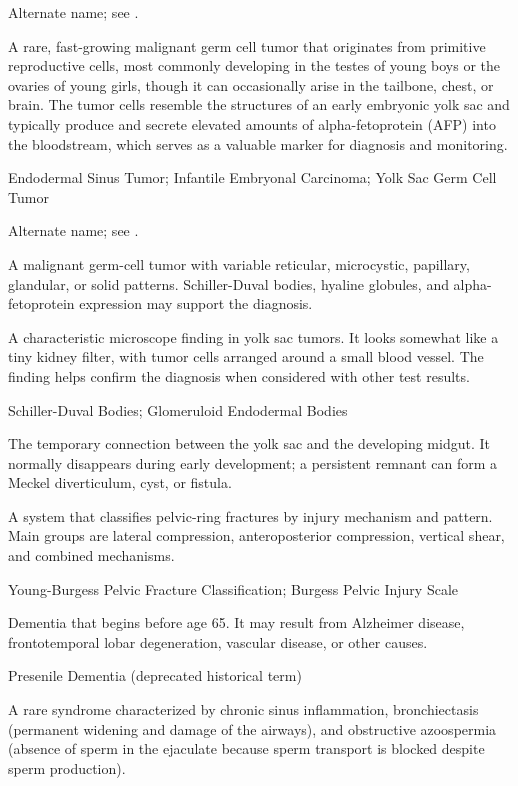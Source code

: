  Alternate name; see .

 A rare, fast-growing malignant germ cell tumor that originates from primitive reproductive cells, most commonly developing in the testes of young boys or the ovaries of young girls, though it can occasionally arise in the tailbone, chest, or brain. The tumor cells resemble the structures of an early embryonic yolk sac and typically produce and secrete elevated amounts of alpha-fetoprotein (AFP) into the bloodstream, which serves as a valuable marker for diagnosis and monitoring.

\synonyms
Endodermal Sinus Tumor; Infantile Embryonal Carcinoma; Yolk Sac Germ Cell Tumor

 Alternate name; see .

 A malignant germ-cell tumor with variable reticular, microcystic, papillary, glandular, or solid patterns. Schiller-Duval bodies, hyaline globules, and alpha-fetoprotein expression may support the diagnosis.

 A characteristic microscope finding in yolk sac tumors. It looks somewhat like a tiny kidney filter, with tumor cells arranged around a small blood vessel. The finding helps confirm the diagnosis when considered with other test results.

\synonyms
Schiller-Duval Bodies; Glomeruloid Endodermal Bodies

 The temporary connection between the yolk sac and the developing midgut. It normally disappears during early development; a persistent remnant can form a Meckel diverticulum, cyst, or fistula.

 A system that classifies pelvic-ring fractures by injury mechanism and pattern. Main groups are lateral compression, anteroposterior compression, vertical shear, and combined mechanisms.

\synonyms
Young-Burgess Pelvic Fracture Classification; Burgess Pelvic Injury Scale

 Dementia that begins before age 65. It may result from Alzheimer disease, frontotemporal lobar degeneration, vascular disease, or other causes.

\synonyms
Presenile Dementia (deprecated historical term)

 A rare syndrome characterized by chronic sinus inflammation, bronchiectasis (permanent widening and damage of the airways), and obstructive azoospermia (absence of sperm in the ejaculate because sperm transport is blocked despite sperm production).

